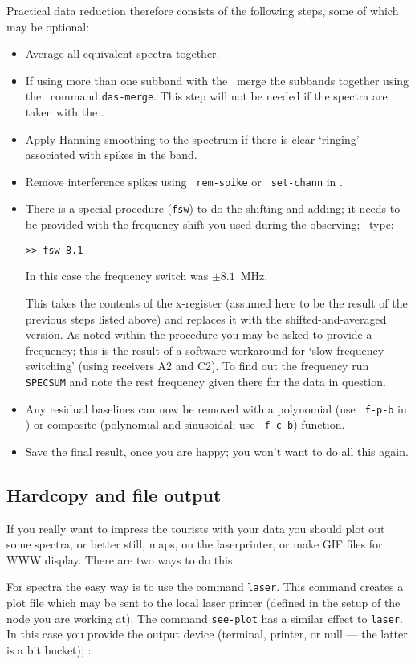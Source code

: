 Practical data reduction therefore consists of the following steps,
some of which may be optional:
\begin{itemize}
\item
Average all equivalent spectra together.
\item
If using more than one subband with the \das\ merge the subbands
together using the \SPECX\ command {\tt das-merge}. This step will not
be needed if the spectra are taken with the \aosc .
\item
Apply Hanning smoothing to the spectrum if there is clear `ringing'
associated with spikes in the band.
\item
Remove interference spikes using \eg\ {\tt rem-spike} or {\tt
set-chann} in {\SPECX}.
\item
There is a special procedure ({\tt{fsw}}) to do the shifting and
adding; it needs to be provided with the frequency shift you used
during the observing; \eg\ type:

\verb|>> fsw 8.1|

In this case the frequency switch was $\pm8.1$~MHz.

This takes the contents of the x-register (assumed here to be the
result of the previous steps listed above) and replaces it with the
shifted-and-averaged version. As noted within the procedure you may be
asked to provide a frequency; this is the result of a software
workaround for `slow-frequency switching' (using receivers A2 and
C2). To find out the frequency run {\tt SPECSUM} and note the rest
frequency given there for the data in question. 

\item
Any residual baselines can now be removed with a polynomial (use {\tt
f-p-b} in {\SPECX}) or composite (polynomial and sinusoidal; use {\tt
f-c-b}) function.
\item
Save the final result, once you are happy; you won't want to do all
this again.
\end{itemize}



\subsection{Hardcopy and file output}
\label{sec:specx_12}
If you really want to impress the tourists with your data you should
plot out some spectra, or better still, maps, on the laserprinter, or make
GIF files for WWW
display.  There are two ways to do this.

For spectra the easy way is to use the command {\tt laser}.  This command
creates
a plot file which may be sent to the local laser printer (defined in the
setup of the node you are working at).  The command {\tt see-plot} has
a similar effect to {\tt laser}. In this case you provide the output
device (terminal, printer, or null --- the latter is a bit bucket);
\eg :

